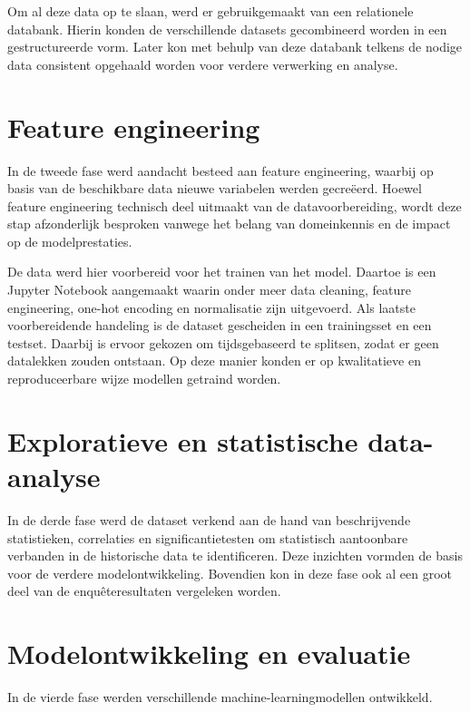 \vspace{5pt}

Om al deze data op te slaan, werd er gebruikgemaakt van een relationele databank. Hierin konden de verschillende datasets gecombineerd worden in een gestructureerde vorm.
Later kon met behulp van deze databank telkens de nodige data consistent opgehaald worden voor verdere verwerking en analyse.

\section{Feature engineering}
In de tweede fase werd aandacht besteed aan feature engineering, waarbij op basis van de beschikbare data nieuwe variabelen werden gecreëerd.
Hoewel feature engineering technisch deel uitmaakt van de datavoorbereiding,
wordt deze stap afzonderlijk besproken vanwege het belang van domeinkennis en de impact op de modelprestaties.

\vspace{5pt}

De data werd hier voorbereid voor het trainen van het model.
Daartoe is een Jupyter Notebook aangemaakt waarin onder meer data cleaning, feature engineering, one-hot encoding en normalisatie zijn uitgevoerd.
Als laatste voorbereidende handeling is de dataset
gescheiden in een trainingsset en een testset. Daarbij is ervoor gekozen
om tijdsgebaseerd te splitsen, zodat er geen datalekken zouden ontstaan.
Op deze manier konden er op kwalitatieve en reproduceerbare wijze modellen getraind worden.

\section{Exploratieve en statistische data-analyse}

In de derde fase werd de dataset verkend aan de hand van beschrijvende statistieken,
correlaties en significantietesten om statistisch aantoonbare verbanden in de historische data te identificeren.
Deze inzichten vormden de basis voor de verdere modelontwikkeling.
Bovendien kon in deze fase ook al een groot deel van de enquêteresultaten vergeleken worden.

\section{Modelontwikkeling en evaluatie}

In de vierde fase werden verschillende machine-learningmodellen ontwikkeld.

